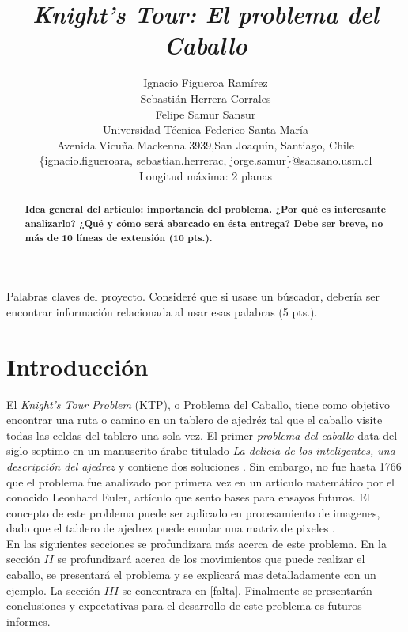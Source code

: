\documentclass[journal, 10pt]{IEEEtran}
\begin{document}
\title{\textit{Knight's Tour:  El problema del Caballo}}
\author{Ignacio Figueroa Ram\'irez \\Sebasti\'an Herrera Corrales\\ Felipe Samur Sansur\\ Universidad T\'ecnica Federico Santa Mar\'ia \\ Avenida Vicu\~na Mackenna 3939,San Joaqu\'in, Santiago, Chile \\
\{ignacio.figueroara, sebastian.herrerac, jorge.samur\}@sansano.usm.cl\\
Longitud máxima: 2 planas}
\maketitle

\begin{abstract}
\textbf{Idea general del artículo: importancia del problema. ¿Por qué es interesante analizarlo? ¿Qué y cómo será abarcado en ésta entrega? Debe ser breve, no más de 10 líneas de extensión (10 pts.).}
\end{abstract}

\begin{IEEEkeywords}
Palabras claves del proyecto. Consideré que si usase un b\'uscador, debería ser encontrar información relacionada al usar esas palabras (5 pts.).
\end{IEEEkeywords}

\section{Introducci\'on}
El \textit{Knight's Tour Problem} (KTP), o Problema del Caballo, tiene como objetivo encontrar una ruta o camino en un tablero de ajedr\'ez tal que el caballo visite todas las celdas del tablero una sola vez.
El primer \textit{problema del caballo} data del siglo septimo en un manuscrito \'arabe titulado \textit{La delicia de los inteligentes, una descripci\'on del ajedrez} y contiene dos soluciones \cite{Murray:1913}. Sin embargo, no fue hasta 1766 que el problema fue analizado por primera vez en un articulo matem\'atico \cite{Euler:1759} por el conocido Leonhard Euler, art\'iculo que sento bases para ensayos futuros. El concepto de este problema puede ser aplicado en procesamiento de imagenes, dado que el tablero de ajedrez puede emular una matriz de pixeles \cite{Xiaoyong:2017}.\\
En las siguientes secciones se profundizara m\'as acerca de este problema. En la secci\'on $II$ se profundizar\'a acerca de los movimientos que puede realizar el caballo, se presentar\'a el problema y se explicar\'a mas detalladamente con un ejemplo. La secci\'on $III$ se concentrara en [falta]. Finalmente se presentar\'an conclusiones y expectativas para el desarrollo de este problema es futuros informes.
\end{document}
